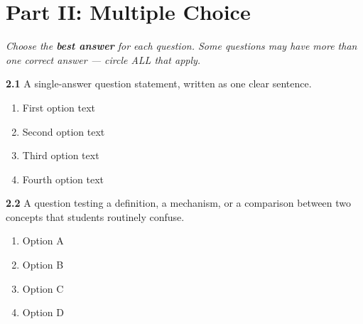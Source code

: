 %
%

\section*{Part II: Multiple Choice}
\textit{Choose the \textbf{best answer} for each question.
Some questions may have more than one correct answer ---
circle ALL that apply.}

\vspace{5mm}

\textbf{2.1}  A single-answer question statement, written as one clear sentence.

\begin{enumerate}[label=\alph*)]
\item First option text
\item Second option text
\item Third option text
\item Fourth option text
\end{enumerate}

\vspace{5mm}

\textbf{2.2}  A question testing a definition, a mechanism, or a comparison
between two concepts that students routinely confuse.

\begin{enumerate}[label=\alph*)]
\item Option A
\item Option B
\item Option C
\item Option D
\end{enumerate}

